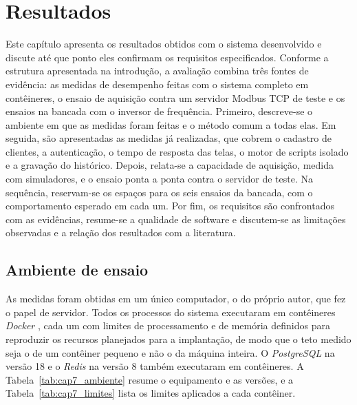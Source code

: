 \newpage
\section{Resultados}

\newcommand{\graficoreservado}[3]{%
\begin{figure}[H]
    \centering
    \caption{#1}
    \label{#2}
    \vspace{0.3cm}
    \fbox{\parbox[c][4.2cm][c]{0.85\textwidth}{\centering Espaço reservado para o gráfico\\ #3}}
    \vspace{0.2cm} \\
    Fonte: Autor.
\end{figure}}

\par Este capítulo apresenta os resultados obtidos com o sistema desenvolvido e discute até que ponto eles confirmam os requisitos especificados. Conforme a estrutura apresentada na introdução, a avaliação combina três fontes de evidência: as medidas de desempenho feitas com o sistema completo em contêineres, o ensaio de aquisição contra um servidor Modbus TCP de teste e os ensaios na bancada com o inversor de frequência. Primeiro, descreve-se o ambiente em que as medidas foram feitas e o método comum a todas elas. Em seguida, são apresentadas as medidas já realizadas, que cobrem o cadastro de clientes, a autenticação, o tempo de resposta das telas, o motor de scripts isolado e a gravação do histórico. Depois, relata-se a capacidade de aquisição, medida com simuladores, e o ensaio ponta a ponta contra o servidor de teste. Na sequência, reservam-se os espaços para os seis ensaios da bancada, com o comportamento esperado em cada um. Por fim, os requisitos são confrontados com as evidências, resume-se a qualidade de software e discutem-se as limitações observadas e a relação dos resultados com a literatura.

\subsection{Ambiente de ensaio}

\par As medidas foram obtidas em um único computador, o do próprio autor, que fez o papel de servidor. Todos os processos do sistema executaram em contêineres \emph{Docker} \cite{DOCKER_DOCS}, cada um com limites de processamento e de memória definidos para reproduzir os recursos planejados para a implantação, de modo que o teto medido seja o de um contêiner pequeno e não o da máquina inteira. O \emph{PostgreSQL} \cite{POSTGRESQL_DOCS} na versão 18 e o \emph{Redis} \cite{REDIS_DOCS} na versão 8 também executaram em contêineres. A Tabela~\ref{tab:cap7_ambiente} resume o equipamento e as versões, e a Tabela~\ref{tab:cap7_limites} lista os limites aplicados a cada contêiner.

